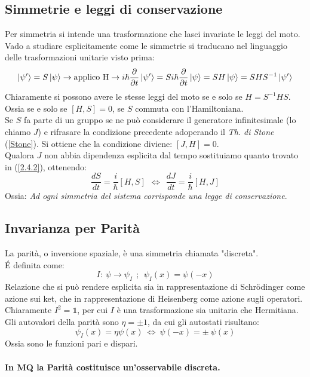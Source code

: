 \documentclass[twoside]{article}
\begin{document}
\vspace{0.5cm}

\subsection{Simmetrie e leggi di conservazione}
Per simmetria si intende una trasformazione che lasci invariate le leggi del moto.
\\
Vado a studiare esplicitamente come le simmetrie si traducano nel linguaggio delle trasformazioni unitarie visto prima:
\begin{equation}
  \ket{\psi'}= S\ket{\psi}  \rightarrow \text{applico H} \rightarrow i\hbar\frac{\partial}{\partial t}\ket{\psi'}=Si\hbar\frac{\partial}{\partial t}\ket{\psi}=SH\ket{\psi}=SHS^{-1}\ket{\psi'} 
\end{equation}
Chiaramente si possono avere le stesse leggi del moto se e solo se $H=S^{-1}HS$. Ossia se e solo se $[H,S]=0$, se $S$ commuta con l'Hamiltoniana.
\\
Se $S$ fa parte di un gruppo se ne può considerare il generatore infinitesimale (lo chiamo $J$) e rifrasare la condizione precedente adoperando il \textit{Th. di Stone} (\ref{Stone}). Si ottiene che la condizione diviene: $[J,H]=0$.
\\
Qualora $J$ non abbia dipendenza esplicita dal tempo sostituiamo quanto trovato in (\ref{2.4.2}), ottenendo:
\begin{equation}
    \frac{dS}{dt}=\frac{i}{\hbar}[H,S] \ \ \iff \ \ \frac{dJ}{dt}=\frac{i}{\hbar}[H,J]
\end{equation}
Ossia: \textit{Ad ogni simmetria del sistema corrisponde una legge di conservazione}.

\vspace{0.5cm}

\subsection{Invarianza per Parità}
La parità, o inversione spaziale, è una simmetria chiamata "discreta".
\\
\'E definita come:
\begin{equation}
I:\ \psi \rightarrow \psi_I \ \ ; \ \ \psi_I (x) =\psi (-x)
\end{equation}
Relazione che si può rendere esplicita sia in rappresentazione di Schr\"odinger come azione sui ket, che in rappresentazione di Heisenberg come azione sugli operatori. \\
Chiaramente $I^2=\mathds{1}$, per cui $I$ è una trasformazione sia unitaria che Hermitiana. Gli autovalori della parità sono $\eta = \pm 1$, da cui gli autostati risultano:
\begin{equation}
    \psi_I(x)=\eta \psi(x) \ \iff \ \psi(-x)=\pm \ \psi(x)
\end{equation}
Ossia sono le funzioni pari e dispari.
\\
\\
\textbf{In MQ la Parità costituisce un'osservabile discreta.}
\end{document}
